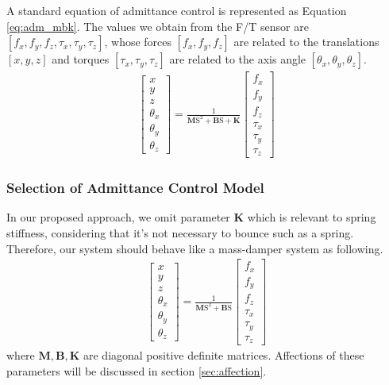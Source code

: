\par
A standard equation of admittance control is represented as Equation \ref{eq:adm_mbk}. The values we obtain from the F/T sensor are $\left[f_x, f_y, f_z,\tau _x, \tau _y, \tau _z \right]$, whose forces $ \left[f_x, f_y, f_z\right]$ are related to the translations $ \left[x, y, z\right]$ and torques $ \left[\tau _x, \tau _y, \tau _z\right]$ are related to the axis angle $ \left[\theta _x,\theta _y,\theta _z\right]$. 
\begin{equation}
\label{eq:adm_mbk}
\begin{split}
\begin{bmatrix}
x \\
y \\
z \\
\theta _x \\
\theta _y \\
\theta _z 
\end{bmatrix}
=
\frac{1}{\mathbf{M}\mathrm{S}^2+\mathbf{B}\mathrm{S}+\mathbf{K}}
\begin{bmatrix}
f_x \\
f_y \\
f_z \\
\tau _x \\
\tau _y \\
\tau _z 
\end{bmatrix}
\end{split}
\end{equation}
\subsubsection{Selection of Admittance Control Model}
\hspace*{6mm}In our proposed approach, we omit parameter $\mathbf{K}$ which is relevant to spring stiffness, considering that it's not necessary to bounce such as a spring. Therefore, our system should behave like a mass-damper system as following.
\begin{equation}
\label{eq:adm_mb}
\begin{split}
\begin{bmatrix}
x \\
y \\
z \\
\theta _x \\
\theta _y \\
\theta _z 
\end{bmatrix}
=
\frac{1}{\mathbf{M}\mathrm{S}^2+\mathbf{B}\mathrm{S}}
\begin{bmatrix}
f_x \\
f_y \\
f_z \\
\tau _x \\
\tau _y \\
\tau _z 
\end{bmatrix}
\end{split}
\end{equation}
where $\mathbf{M},\mathbf{B},\mathbf{K}$ are diagonal positive definite matrices. Affections of these parameters will be discussed in section \ref{sec:affection}.
